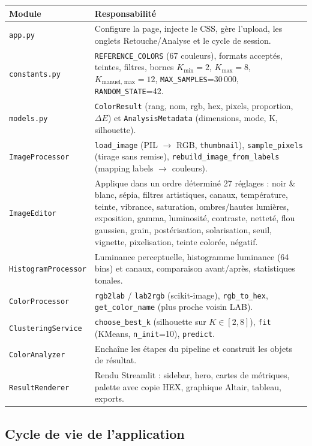 \documentclass[11pt,a4paper]{article}
\begin{document}
\begin{table}[h]
\centering
\small
\begin{tabular}{@{}p{4.2cm}p{11cm}@{}}
\toprule
\textbf{Module} & \textbf{Responsabilité} \\
\midrule
\texttt{app.py} &
Configure la page, injecte le CSS, gère l'upload, les onglets
Retouche/Analyse et le cycle de session. \\
\texttt{constants.py} &
\texttt{REFERENCE\_COLORS} (67 couleurs), formats acceptés, teintes,
filtres, bornes $K_{\min}=2$, $K_{\max}=8$, $K_{\text{manuel, max}}=12$,
\texttt{MAX\_SAMPLES}=30\,000, \texttt{RANDOM\_STATE}=42. \\
\texttt{models.py} &
\texttt{ColorResult} (rang, nom, rgb, hex, pixels, proportion, $\Delta E$)
et \texttt{AnalysisMetadata} (dimensions, mode, K, silhouette). \\
\texttt{ImageProcessor} &
\texttt{load\_image} (PIL $\rightarrow$ RGB, \texttt{thumbnail}),
\texttt{sample\_pixels} (tirage sans remise),
\texttt{rebuild\_image\_from\_labels} (mapping labels $\rightarrow$
couleurs). \\
\texttt{ImageEditor} &
Applique dans un ordre déterminé 27 réglages : noir \& blanc, sépia,
filtres artistiques, canaux, température, teinte, vibrance, saturation,
ombres/hautes lumières, exposition, gamma, luminosité, contraste, netteté,
flou gaussien, grain, postérisation, solarisation, seuil, vignette,
pixelisation, teinte colorée, négatif. \\
\texttt{HistogramProcessor} &
Luminance perceptuelle, histogramme luminance (64 bins) et canaux,
comparaison avant/après, statistiques tonales. \\
\texttt{ColorProcessor} &
\texttt{rgb2lab} / \texttt{lab2rgb} (scikit-image), \texttt{rgb\_to\_hex},
\texttt{get\_color\_name} (plus proche voisin LAB). \\
\texttt{ClusteringService} &
\texttt{choose\_best\_k} (silhouette sur $K \in [2,8]$), \texttt{fit}
(KMeans, \texttt{n\_init}=10), \texttt{predict}. \\
\texttt{ColorAnalyzer} &
Enchaîne les étapes du pipeline et construit les objets de résultat. \\
\texttt{ResultRenderer} &
Rendu Streamlit : sidebar, hero, cartes de métriques, palette avec copie
HEX, graphique Altair, tableau, exports. \\
\bottomrule
\end{tabular}
\end{table}

\subsection{Cycle de vie de l'application}
\end{document}
